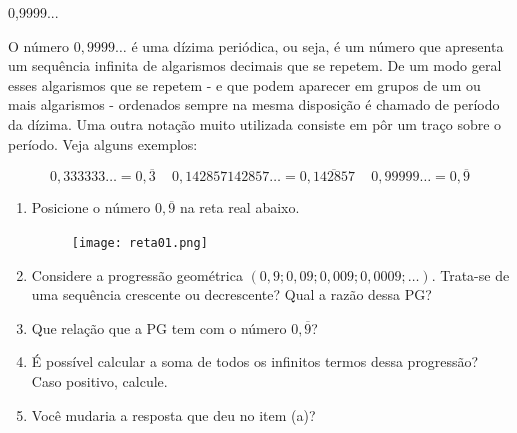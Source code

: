 \begin{task}{0,9999...}

O número $0,9999\ldots$ é uma dízima periódica, ou seja, é um número que apresenta um sequência infinita de algarismos decimais que se repetem. De um modo geral esses algarismos que se repetem - e que podem aparecer em grupos de um ou mais algarismos - ordenados sempre na mesma disposição é chamado de período da dízima. Uma outra notação muito utilizada consiste em pôr um traço sobre o período. Veja alguns exemplos:

\[
0{,}333333\ldots = 0,\overline{3} \,\ \,\ \,\   0{,}142857142857\ldots = 0{,}\overline{142857} \,\ \,\ \,\ 0{,}99999\ldots = 0{,}\overline{9}
\]

\begin{enumerate}

\item{}
Posicione o número $0,\overline{9}$ na reta real abaixo.

\begin{figure}[H]
\centering
\texttt{[image: reta01.png]}
\end{figure}

\item{}
Considere a progressão geométrica $(0{,}9; 0{,}09; 0{,}009; 0{,}0009; \ldots )$. Trata-se de uma sequência crescente ou decrescente? Qual a razão dessa PG?

\item{}
Que relação que a PG tem com o número $0,\overline{9}$?

\item{}
É possível calcular a soma de todos os infinitos termos dessa progressão? Caso positivo, calcule.

\item{}
Você mudaria a resposta que deu no item (a)?

\end{enumerate}

\end{task}


